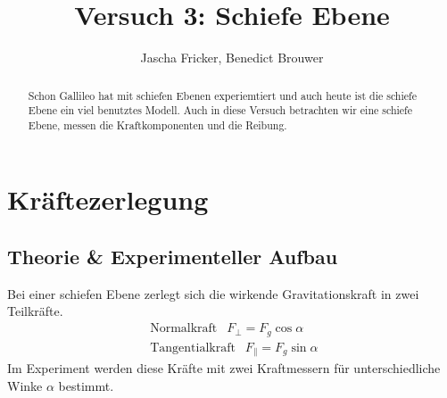 \documentclass[11pt, a4paper]{article}
\title{Versuch 3: Schiefe Ebene}
\author{Jascha Fricker, Benedict Brouwer}
\begin{document}
    \maketitle

    

    \begin{abstract}
        Schon Gallileo hat mit schiefen Ebenen experiemtiert und auch heute ist die schiefe Ebene ein viel benutztes
        Modell. Auch in diese Versuch betrachten wir eine schiefe Ebene, messen die Kraftkomponenten und
        die Reibung. 
    \end{abstract}

    \tableofcontents

    \newpage

    \section{Kräftezerlegung}
    \subsection{Theorie \& Experimenteller Aufbau}
    Bei einer schiefen Ebene zerlegt sich die wirkende Gravitationskraft in zwei Teilkräfte.
    \begin{align}
        \text{ Normalkraft } \ \ F_\perp = F_g \cos \alpha \\
        \text{ Tangentialkraft } \ \ F_\parallel = F_g \sin \alpha 
    \end{align}
    Im Experiment werden diese Kräfte mit zwei Kraftmessern für unterschiedliche Winke $\alpha$ bestimmt.
\end{document}
